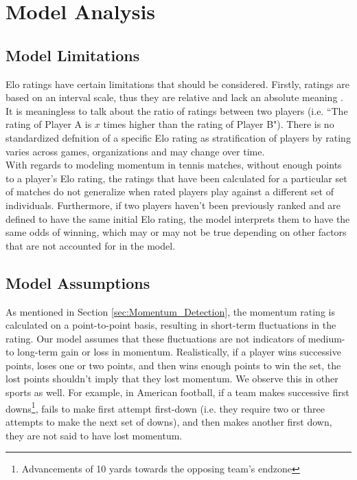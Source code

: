 \documentclass[letterpaper, 12pt]{article}
\begin{document}
    \section{Model Analysis}
    
        \subsection{Model Limitations}

            Elo ratings have certain limitations that should be considered. Firstly, ratings are based on an interval scale, thus they are relative and lack an absolute meaning \cite{Elo1986}. It is meaningless to talk about the ratio of ratings between two players (i.e. ``The rating of Player A is $x$ times higher than the rating of Player B"). There is no standardized defnition of a specific Elo rating as stratification of players by rating varies across games, organizations and may change over time. \\

            \noindent
            With regards to modeling momentum in tennis matches, without enough points to a player's Elo rating, the ratings that have been calculated for a particular set of matches do not generalize when rated players play against a different set of individuals. Furthermore, if two players haven't been previously ranked and are defined to have the same initial Elo rating, the model interprets them to have the same odds of winning, which may or may not be true depending on other factors that are not accounted for in the model.
    
        \subsection{Model Assumptions} \label{sec:Model_Assumptions}

            As mentioned in Section \ref{sec:Momentum_Detection}, the momentum rating is calculated on a point-to-point basis, resulting in short-term fluctuations in the rating. Our model assumes that these fluctuations are not indicators of medium- to long-term gain or loss in momentum. Realistically, if a player wins successive points, loses one or two points, and then wins enough points to win the set, the lost points shouldn't imply that they lost momentum. We observe this in other sports as well. For example, in American football, if a team makes successive first downs\footnote{Advancements of 10 yards towards the opposing team's endzone}, fails to make first attempt first-down (i.e. they require two or three attempts to make the next set of downs), and then makes another first down, they are not said to have lost momentum. 
\end{document}
